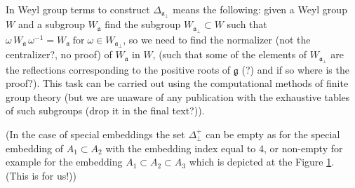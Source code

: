 \documentclass[a4paper,12pt]{article}
\theoremstyle{definition} \newtheorem{Def}{Definition}
\begin{document}
In Weyl group terms to construct $\Delta _{\mathfrak{a}_{\bot}} $ means the following: given a Weyl group $W$ and a subgroup $W_{\mathfrak{a}}$ find the subgroup $W_{\mathfrak{a}_{\bot}}\subset W$ such that $\omega\, W_{\mathfrak{a}}\,\omega^{-1}=W_{\mathfrak{a}} \;\text{for}\; \omega\in W_{\mathfrak{a}_{\bot}}$, so we need to find the normalizer {\color{red} (not the centralizer?, no proof)} of $W_{\mathfrak{a}}$ in $W$, (such that some of the elements of $W_{\mathfrak{a}_{\bot}}$ are the reflections corresponding to the positive roots of $\mathfrak{g}$  {\color{red}(?) and if so where is the proof?}). This task can be carried out using the computational methods of finite group theory \cite{stembridge2001computational} (but we are unaware of any publication with the exhaustive tables of such subgroups {\color{red}(drop it in the final text?)}).


(In the case of special embeddings the set $\Delta^{+}_{\bot}$ can be empty as for the
special embedding of $A_1\subset A_2$ with the embedding index equal to 4, or non-empty for example for the embedding $A_1\subset A_2\subset A_3$ which is depicted at the Figure \ref{fig:a1a2a3}. {\color{red}(This is for us!)})
\begin{figure}[ph]
\noindent  {}
  \label{fig:a1a2a3}
\end{figure}
\end{document}

